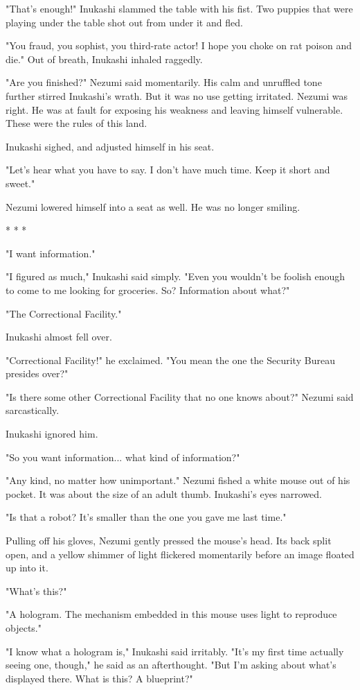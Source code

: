 "That's enough!" Inukashi slammed the table with his fist. Two puppies
that were playing under the table shot out from under it and fled.

"You fraud, you sophist, you third-rate actor! I hope you choke on rat
poison and die." Out of breath, Inukashi inhaled raggedly.

"Are you finished?" Nezumi said momentarily. His calm and unruffled tone
further stirred Inukashi's wrath. But it was no use getting irritated.
Nezumi was right. He was at fault for exposing his weakness and leaving
himself vulnerable. These were the rules of this land.

Inukashi sighed, and adjusted himself in his seat.

"Let's hear what you have to say. I don't have much time. Keep it short
and sweet."

Nezumi lowered himself into a seat as well. He was no longer smiling.

* * *

"I want information."

"I figured as much," Inukashi said simply. "Even you wouldn't be foolish
enough to come to me looking for groceries. So? Information about what?"

"The Correctional Facility."

Inukashi almost fell over.

"Correctional Facility!" he exclaimed. "You mean the one the Security
Bureau presides over?"

"Is there some other Correctional Facility that no one knows about?"
Nezumi said sarcastically.

Inukashi ignored him.

"So you want information... what kind of information?"

"Any kind, no matter how unimportant." Nezumi fished a white mouse out
of his pocket. It was about the size of an adult thumb. Inukashi's eyes
narrowed.

"Is that a robot? It's smaller than the one you gave me last time."

Pulling off his gloves, Nezumi gently pressed the mouse's head. Its back
split open, and a yellow shimmer of light flickered momentarily before
an image floated up into it.

"What's this?"

"A hologram. The mechanism embedded in this mouse uses light to
reproduce objects."

"I know what a hologram is," Inukashi said irritably. "It's my first
time actually seeing one, though," he said as an afterthought. "But I'm
asking about what's displayed there. What is this? A blueprint?"

